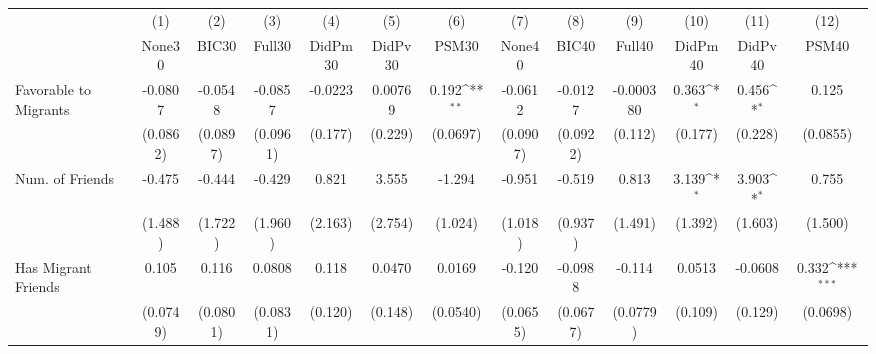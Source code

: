 {
\def\sym#1{\ifmmode^{#1}\else\(^{#1}\)\fi}
\begin{tabular}{l*{12}{c}}
\toprule
            &\multicolumn{1}{c}{(1)}&\multicolumn{1}{c}{(2)}&\multicolumn{1}{c}{(3)}&\multicolumn{1}{c}{(4)}&\multicolumn{1}{c}{(5)}&\multicolumn{1}{c}{(6)}&\multicolumn{1}{c}{(7)}&\multicolumn{1}{c}{(8)}&\multicolumn{1}{c}{(9)}&\multicolumn{1}{c}{(10)}&\multicolumn{1}{c}{(11)}&\multicolumn{1}{c}{(12)}\\
            &\multicolumn{1}{c}{None30}&\multicolumn{1}{c}{BIC30}&\multicolumn{1}{c}{Full30}&\multicolumn{1}{c}{DidPm30}&\multicolumn{1}{c}{DidPv30}&\multicolumn{1}{c}{PSM30}&\multicolumn{1}{c}{None40}&\multicolumn{1}{c}{BIC40}&\multicolumn{1}{c}{Full40}&\multicolumn{1}{c}{DidPm40}&\multicolumn{1}{c}{DidPv40}&\multicolumn{1}{c}{PSM40}\\
\midrule
Favorable to Migrants&     -0.0807         &     -0.0548         &     -0.0857         &     -0.0223         &     0.00769         &       0.192\sym{**} &     -0.0612         &     -0.0127         &   -0.000380         &       0.363\sym{*}  &       0.456\sym{*}  &       0.125         \\
            &    (0.0862)         &    (0.0897)         &    (0.0961)         &     (0.177)         &     (0.229)         &    (0.0697)         &    (0.0907)         &    (0.0922)         &     (0.112)         &     (0.177)         &     (0.228)         &    (0.0855)         \\
\addlinespace
Num. of Friends&      -0.475         &      -0.444         &      -0.429         &       0.821         &       3.555         &      -1.294         &      -0.951         &      -0.519         &       0.813         &       3.139\sym{*}  &       3.903\sym{*}  &       0.755         \\
            &     (1.488)         &     (1.722)         &     (1.960)         &     (2.163)         &     (2.754)         &     (1.024)         &     (1.018)         &     (0.937)         &     (1.491)         &     (1.392)         &     (1.603)         &     (1.500)         \\
\addlinespace
Has Migrant Friends&       0.105         &       0.116         &      0.0808         &       0.118         &      0.0470         &      0.0169         &      -0.120         &     -0.0988         &      -0.114         &      0.0513         &     -0.0608         &       0.332\sym{***}\\
            &    (0.0749)         &    (0.0801)         &    (0.0831)         &     (0.120)         &     (0.148)         &    (0.0540)         &    (0.0655)         &    (0.0677)         &    (0.0779)         &     (0.109)         &     (0.129)         &    (0.0698)         \\

\end{tabular}}
